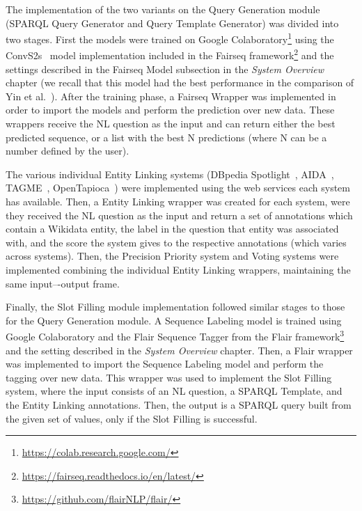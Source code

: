 The implementation of the two variants on the Query Generation module (SPARQL Query Generator 
and Query Template Generator) was divided into two stages. First the models were trained on 
Google Colaboratory\footnote{\url{https://colab.research.google.com/}} using the 
ConvS2s~\cite{nmt:convS2S-GehringAGYD17} model implementation included in the Fairseq 
framework\footnote{\url{https://fairseq.readthedocs.io/en/latest/}} and the settings described in the 
Fairseq Model subsection in the \textit{System Overview} chapter (we recall that this model had 
the best performance in the comparison of Yin et al.~\cite{nmt:nl-to-sparql-Yin19}). After the 
training phase, a Fairseq Wrapper was implemented in order to import the models and perform the 
prediction over new data. These wrappers receive the NL question as the input and can return 
either the best predicted sequence, or a list with the best N predictions (where N can be a 
number defined by the user).

The various individual Entity Linking systems (DBpedia Spotlight~\cite{EL:dbpedia-spotlight-MendesJGB11}, 
AIDA~\cite{EL:aida-tool-YosefHBSW11, EL:aida-HoffartYBFPSTTW11}, TAGME~\cite{EL:tagme-FerraginaS10}, 
OpenTapioca~\cite{EL:opentapioca-Delpeuch19}) were implemented using the web services each system 
has available. Then, a Entity Linking wrapper was created for each system, were they received the 
NL question as the input and return a set of annotations which contain a Wikidata entity, the 
label in the question that entity was associated with, and the score the system gives to the 
respective annotations (which varies across systems). Then, the Precision Priority system and 
Voting systems were implemented combining the individual Entity Linking wrappers, maintaining 
the same input–-output frame.

Finally, the Slot Filling module implementation followed similar stages to those for the Query 
Generation module. A Sequence Labeling model is trained using Google Colaboratory and the Flair 
Sequence Tagger from the Flair framework\footnote{\url{https://github.com/flairNLP/flair/}} and 
the setting described in the \textit{System Overview} chapter. Then, a Flair wrapper was 
implemented to import the Sequence Labeling model and perform the tagging over new data. This 
wrapper was used to implement the Slot Filling system, where the input consists of an NL question, 
a SPARQL Template, and the Entity Linking annotations. Then, the output is a SPARQL query built 
from the given set of values, only if the Slot Filling is successful.

